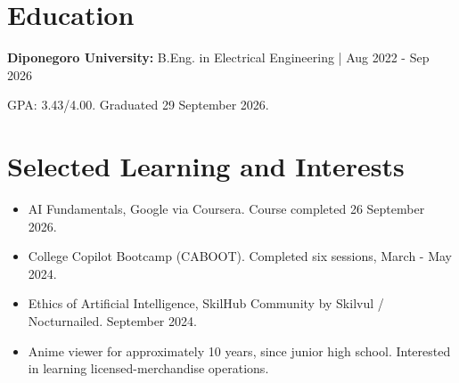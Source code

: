 \documentclass[11pt,a4paper]{article}
\begin{document}
\section{Education}
\textbf{Diponegoro University:} B.Eng. in Electrical Engineering | Aug 2022 - Sep 2026\par
GPA: 3.43/4.00. Graduated 29 September 2026.
\section{Selected Learning and Interests}
\begin{itemize}
\item AI Fundamentals, Google via Coursera. Course completed 26 September 2026.
\item College Copilot Bootcamp (CABOOT). Completed six sessions, March - May 2024.
\item Ethics of Artificial Intelligence, SkilHub Community by Skilvul / Nocturnailed. September 2024.
\item Anime viewer for approximately 10 years, since junior high school. Interested in learning licensed-merchandise operations.
\end{itemize}
\end{document}
